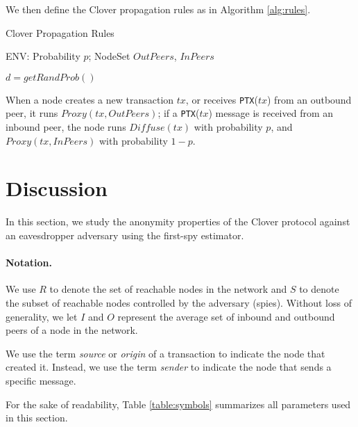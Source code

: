 \documentclass{article}
\begin{document}
	We then define the Clover propagation rules as in Algorithm \ref{alg:rules}.
	\vspace{-5pt}
	\begin{algorithm}[h]
		\caption{Clover Propagation Rules}
		\label{alg:rules}
		\begin{algorithmic}[1]
			\State ENV: Probability $p$; NodeSet $OutPeers$, $InPeers$
			\State {}
			\EndIf
			
			\State {}
			\Else
			\State $d = getRandProb()$
			\State {}
			\Else 
			\State {}
			\EndIf
			\EndIf
			\EndIf
			\EndProcedure
		\end{algorithmic}
	\end{algorithm}
	
	When a node creates a new transaction $tx$, or receives \texttt{PTX}($tx$) from an outbound peer, it runs $Proxy(tx, OutPeers)$;
	if a \texttt{PTX}($tx$) message is received from an inbound peer, the node runs $Diffuse(tx)$ with probability $p$, and $Proxy(tx, InPeers)$ with probability $1{-}p$.
	
	\section{Discussion}
	\label{sec:analysis}
	In this section, we study the anonymity properties of the Clover protocol against an eavesdropper adversary using the first-spy estimator.
	
	\paragraph{Notation.}
	We use $R$ to denote the set of reachable nodes in the network and $S$ to denote the subset of reachable nodes controlled by the adversary (spies).
	Without loss of generality, we let $I$ and $O$ represent the average set of inbound and outbound peers of a node in the network.
	
	We use the term \textit{source} or \textit{origin} of a transaction to indicate the node that created it.
	Instead, we use the term \textit{sender} to indicate the node that sends a specific message.
	
	For the sake of readability, Table \ref{table:symbols} summarizes all parameters used in this section.
	
\end{document}
